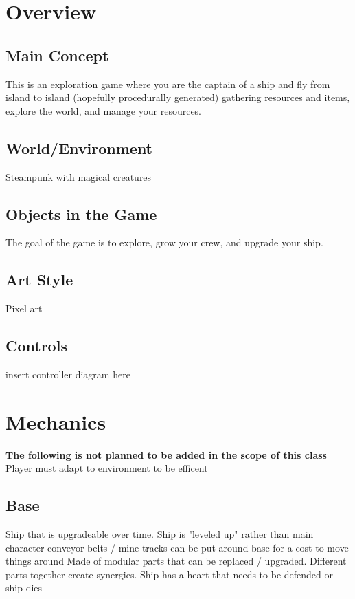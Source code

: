 \documentclass[a4paper]{scrreprt}
\begin{document}


\chapter{Overview}

\section{Main Concept}
This is an exploration game where you are the captain of a ship and fly from island to island (hopefully procedurally generated) gathering resources and items, explore the world, and manage your resources.

\section{World/Environment}
Steampunk with magical creatures

\section{Objects in the Game}
The goal of the game is to explore, grow your crew, and upgrade your ship.

\section{Art Style}
Pixel art

\section{Controls}
insert controller diagram here



\chapter{Mechanics}
\textbf {The following is not planned to be added in the scope of this class}
\newline Player must adapt to environment to be efficent

\section{Base}
Ship that is upgradeable over time.
\newline Ship is "leveled up" rather than main character
\newline conveyor belts / mine tracks can be put around base for a cost to move things around
\newline Made of modular parts that can be replaced / upgraded.
\newline Different parts together create synergies.
\newline Ship has a heart that needs to be defended or ship dies
\end{document}
